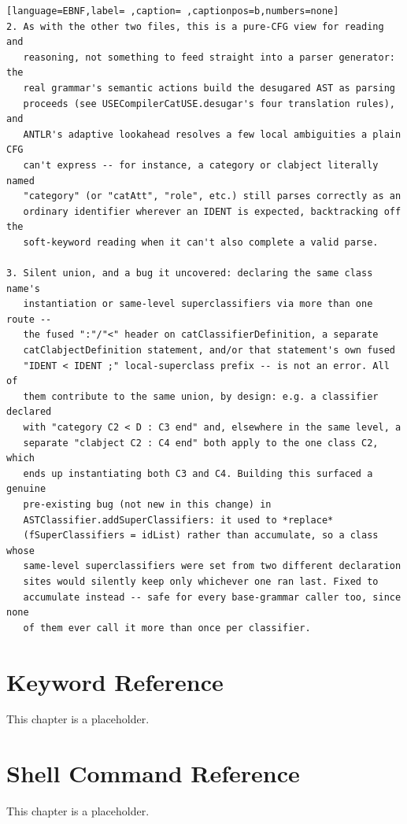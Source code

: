 \documentclass[11pt,twoside,a4paper]{book}
\begin{document}
\begin{lstlisting}[language=EBNF,label= ,caption= ,captionpos=b,numbers=none]
2. As with the other two files, this is a pure-CFG view for reading and
   reasoning, not something to feed straight into a parser generator: the
   real grammar's semantic actions build the desugared AST as parsing
   proceeds (see USECompilerCatUSE.desugar's four translation rules), and
   ANTLR's adaptive lookahead resolves a few local ambiguities a plain CFG
   can't express -- for instance, a category or clabject literally named
   "category" (or "catAtt", "role", etc.) still parses correctly as an
   ordinary identifier wherever an IDENT is expected, backtracking off the
   soft-keyword reading when it can't also complete a valid parse.

3. Silent union, and a bug it uncovered: declaring the same class name's
   instantiation or same-level superclassifiers via more than one route --
   the fused ":"/"<" header on catClassifierDefinition, a separate
   catClabjectDefinition statement, and/or that statement's own fused
   "IDENT < IDENT ;" local-superclass prefix -- is not an error. All of
   them contribute to the same union, by design: e.g. a classifier declared
   with "category C2 < D : C3 end" and, elsewhere in the same level, a
   separate "clabject C2 : C4 end" both apply to the one class C2, which
   ends up instantiating both C3 and C4. Building this surfaced a genuine
   pre-existing bug (not new in this change) in
   ASTClassifier.addSuperClassifiers: it used to *replace*
   (fSuperClassifiers = idList) rather than accumulate, so a class whose
   same-level superclassifiers were set from two different declaration
   sites would silently keep only whichever one ran last. Fixed to
   accumulate instead -- safe for every base-grammar caller too, since none
   of them ever call it more than once per classifier.
\end{lstlisting}
\chapter{Keyword Reference}
\label{sec:org46d74f9}
This chapter is a placeholder.
\chapter{Shell Command Reference}
\label{sec:orgbffd437}
This chapter is a placeholder.

\backmatter

\printindex
\end{document}
